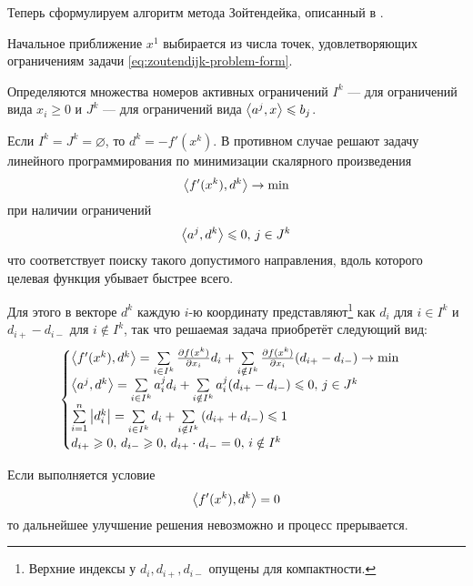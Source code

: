Теперь сформулируем алгоритм метода Зойтендейка, описанный в
\cite{himmelblau75}.

Начальное приближение $x^1$ выбирается из числа точек, удовлетворяющих
ограничениям задачи \eqref{eq:zoutendijk-problem-form}.

\begin{ssteps}
\item Определяются множества номеров активных ограничений $I^k$ — для
  ограничений вида $x_i \geq 0$ и $J^k$ — для ограничений вида
  ${\left \langle a^j,x \right \rangle} \leqslant b_j$.
\item Если $I^k=J^k = \varnothing$, то $d^k=-f'(x^k)$. В противном
  случае решают задачу линейного программирования по минимизации
  скалярного произведения
  \begin{equation*}
    {\left \langle f'(x^k), d^k \right \rangle} \to \min
  \end{equation*}
  при наличии ограничений
  \begin{equation*}
    {\left \langle a^j, d^k \right \rangle} \leqslant 0,\, j\in J^k
  \end{equation*}
  что соответствует поиску такого допустимого направления, вдоль
  которого целевая функция убывает быстрее всего.

  Для этого в векторе $d^k$ каждую $i$-ю координату
  представляют\footnote{Верхние индексы у $d_i, d_{i+}, d_{i-}$
    опущены для компактности.} как $d_i$ для $i \in I^k$ и
  $d_{i+}-d_{i-}$ для $i \notin I^k$, так что решаемая задача
  приобретёт следующий вид:
  \begin{equation}
    \label{eq:zoutendijk-linprog}
    \begin{cases}
      {\left \langle f'(x^k), d^k \right \rangle} = 
      \sum\limits_{i\in I^k}{\frac{\partial{f(x^k)}}{\partial{x_i}}d_i} + 
      \sum\limits_{i \notin I^k}{\frac{\partial{f(x^k)}}{\partial{x_i}}(d_{i+}-d_{i-})}
      \to \min\\
      
      {\left \langle a^j, d^k \right \rangle} = 
      \sum\limits_{i\in I^k}{a^j_id_i} +
      \sum\limits_{i \notin I^k}{a^j_i(d_{i+}-d_{i-})} \leqslant 0,
      \, j\in J^k \\
      
      \sum\limits_{i=1}^n\left \lvert{d_i^k}\right \rvert = \sum\limits_{i\in I^k}{d_i}+
      \sum\limits_{i \notin I^k}{\left( d_{i+} + d_{i-}\right)} \leqslant 1\\
      
      d_{i+} \geqslant 0,\, d_{i-} \geqslant 0,\,d_{i+}\cdot d_{i-}=0,\, i\notin I^k
    \end{cases}
  \end{equation}
\item Если выполняется условие
  \begin{equation}
    \label{eq:zoutendijk-halt}
    {\left \langle f'(x^k), d^k \right \rangle} = 0
  \end{equation}
  то дальнейшее улучшение решения невозможно и процесс прерывается.


\end{ssteps}
